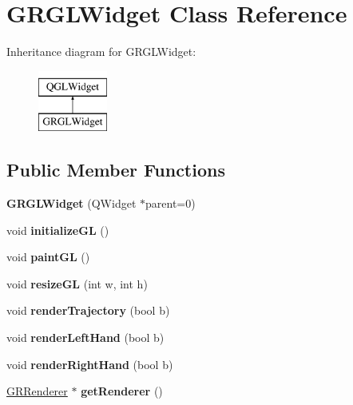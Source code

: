 \hypertarget{classGRGLWidget}{}\section{G\+R\+G\+L\+Widget Class Reference}
\label{classGRGLWidget}
Inheritance diagram for G\+R\+G\+L\+Widget\+:\begin{figure}[H]
\begin{center}
\leavevmode
\includegraphics[height=2.000000cm]{classGRGLWidget}
\end{center}
\end{figure}
\subsection*{Public Member Functions}
\begin{DoxyCompactItemize}
\item 
\mbox{\label{classGRGLWidget_a604f72500b7d7633c399ff18bb95a40e}} 
{\bfseries G\+R\+G\+L\+Widget} (Q\+Widget $\ast$parent=0)
\item 
\mbox{\label{classGRGLWidget_a8173ef0413e10d9976cac400a94ab4ca}} 
void {\bfseries initialize\+GL} ()
\item 
\mbox{\label{classGRGLWidget_a0aeed155942eb0d83ad1074f41dbf582}} 
void {\bfseries paint\+GL} ()
\item 
\mbox{\label{classGRGLWidget_a4f79bea08dce6d6df25700fea8b0885b}} 
void {\bfseries resize\+GL} (int w, int h)
\item 
\mbox{\label{classGRGLWidget_a3a9c9b161ef9b40c0084d0cbd2acf494}} 
void {\bfseries render\+Trajectory} (bool b)
\item 
\mbox{\label{classGRGLWidget_a96f436eae2df195d9e742e0cd548094d}} 
void {\bfseries render\+Left\+Hand} (bool b)
\item 
\mbox{\label{classGRGLWidget_a11101b4430971875519637cc2d41c9e6}} 
void {\bfseries render\+Right\+Hand} (bool b)
\item 
\mbox{\label{classGRGLWidget_adf4db4c0ea49f54f843f1638771e4037}} 
\mbox{\hyperlink{classGRRenderer}{G\+R\+Renderer}} $\ast$ {\bfseries get\+Renderer} ()
\end{DoxyCompactItemize}
